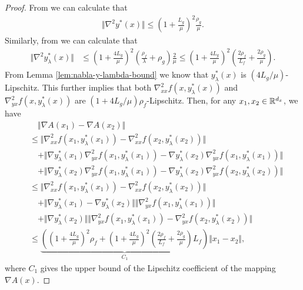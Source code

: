 \begin{proof}
From  we can calculate that 
\begin{align} \label{bound:nabla2-yx}
    \Vert \nabla^2 y^*(x) \Vert \le \left( 1 + \frac{L_g}{\mu} \right)^2 \frac{\rho_g}{\mu}  .
\end{align}
Similarly, from  we can calculate that
\begin{align} \label{bound:nabla2-y-lambda}
    \Vert \nabla^2 y_{\lambda}^*(x)  \Vert &\le \left( 1 + \frac{4L_g}{\mu} \right)^2 \left( \frac{\rho_f}{\lambda}+ \rho_g \right) \frac{2}{\mu} \le \left( 1 + \frac{4L_g}{\mu} \right)^2 \left( \frac{2\rho_f}{L_f} + \frac{2 \rho_g}{\mu} \right). 
\end{align}
From Lemma \ref{lem:nabla-y-lambda-bound} we know that $y_{\lambda}^*(x)$ is $(4L_g/\mu)$-Lipschitz. This further implies that both $ \nabla_{xx}^2 f(x,y_{\lambda}^*(x))$ and $\nabla_{yx}^2 f(x,y_{\lambda}^*(x)) $ are $(1+ 4L_g/ \mu)\rho_f$-Lipschitz. Then, for any $x_1,x_2 \in {\mathbb{R}}^{d_x}$, we have
\begin{align*}
    &\quad  \Vert \nabla A(x_1) - \nabla A(x_2) \Vert \\
   &\le \Vert  \nabla_{xx}^2 f(x_1,y_{\lambda}^*(x_1)) - \nabla_{xx}^2 f(x_2, y_{\lambda}^*(x_2)) \Vert  \\
   &\quad + \Vert \nabla y_{\lambda}^*(x_1) \nabla_{yx}^2 f(x_1,y_{\lambda}^*(x_1)) - \nabla y_{\lambda}^*(x_2) \nabla_{yx}^2 f(x_1,y_{\lambda}^*(x_1)) \Vert \\
   &\quad + \Vert \nabla y_{\lambda}^*(x_2) \nabla_{yx}^2 f(x_1,y_{\lambda}^*(x_1)) - \nabla y_{\lambda}^*(x_2) \nabla_{yx}^2 f(x_2,y_{\lambda}^*(x_2)) \Vert \\
   &\le \Vert \nabla_{xx}^2 f(x_1,y_{\lambda}^*(x_1)) - \nabla_{xx}^2 f(x_2, y_{\lambda}^*(x_2)) \Vert  \\
   &\quad + \Vert \nabla y_{\lambda}^*(x_1) - \nabla y_{\lambda}^*(x_2) \Vert \Vert \nabla_{yx}^2 f(x_1,y_{\lambda}^*(x_1)) \Vert \\
   &\quad + \Vert \nabla y_{\lambda}^*(x_2) \Vert \Vert \nabla_{yx}^2 f(x_1,y_{\lambda}^*(x_1)) - \nabla_{yx}^2 f(x_2,y_{\lambda}^*(x_2)) \Vert \\
   &\le \underbrace{\left(\left( 1+ \frac{4L_g}{\mu} \right)^2 \rho_f + \left( 1 + \frac{4L_g}{\mu} \right)^2 \left( \frac{2\rho_f}{L_f} + \frac{2 \rho_g}{\mu} \right) L_f \right)}_{C_1}\Vert x_1-x_2 \Vert,
\end{align*}
where $C_1$ gives the upper bound of the Lipschitz coefficient of the mapping $\nabla A(x)$.


\end{proof}
